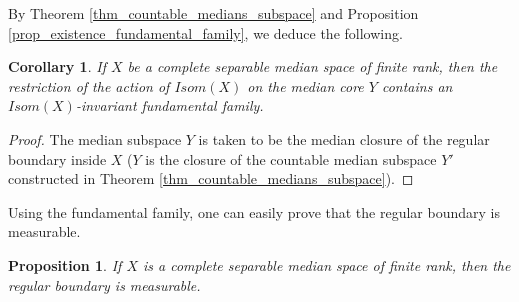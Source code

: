 \documentclass{amsart}
\numberwithin{equation}{section}
\newtheorem{prop}[thm]{Proposition}
\newtheorem{cor}[thm]{Corollary}
\theoremstyle{definition}
\begin{document}
By Theorem \ref{thm_countable_medians_subspace} and Proposition \ref{prop_existence_fundamental_family}, we deduce the following.
\begin{cor}
    If $X$ be a complete separable median space of finite rank, then the restriction of the action of $Isom(X)$ on the median core $Y$ contains an $Isom(X)$-invariant fundamental family. 
\end{cor}
\begin{proof}
    The median subspace $Y$ is taken to be the median closure of the regular boundary inside $X$ ($Y$ is the closure of the countable median subspace $Y'$ constructed in Theorem \ref{thm_countable_medians_subspace}).
\end{proof}
Using the fundamental family, one can easily prove that the regular boundary is measurable.
\begin{prop}\label{prop_regular_boundary_measurable}
    If $X$ is a complete separable median space of finite rank, then the regular boundary is measurable.
\end{prop}
\end{document}
